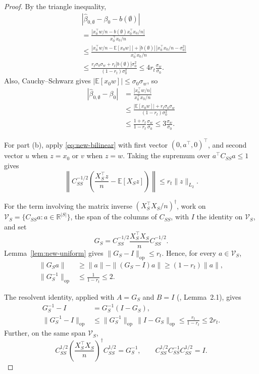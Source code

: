 \documentclass[a4paper,10pt,english]{article}
\theoremstyle{definition}
\begin{document}
\begin{review}
\begin{proof}
By the triangle inequality,
\[
 \begin{aligned}
 &|\hat\beta_{0,\emptyset}-\beta_0-b(\emptyset)|\\
 &=
 \frac{
 |x_0^\top w/n-b(\emptyset)x_0^\top x_0/n|
 }{x_0^\top x_0/n}\\
 &\le
 \frac{
 |x_0^\top w/n-\mathbb E[x_0w]|
 +|b(\emptyset)|\,|x_0^\top x_0/n-\sigma_0^2|
 }{x_0^\top x_0/n}\\
 &\le
 \frac{
 r_t\sigma_0\sigma_w+r_t|b(\emptyset)|\sigma_0^2
 }{(1-r_t)\sigma_0^2}
 \le4r_t\frac{\sigma_w}{\sigma_0}.
 \end{aligned}
\]
\rbreak
Also, Cauchy--Schwarz gives
\(|\mathbb E[x_0w]|\le\sigma_0\sigma_w\), so
\[
 \begin{aligned}
 |\hat\beta_{0,\emptyset}-\beta_0|
 &=
 \frac{|x_0^\top w/n|}{x_0^\top x_0/n}\\
 &\le
 \frac{|\mathbb E[x_0w]|+r_t\sigma_0\sigma_w}
 {(1-r_t)\sigma_0^2}\\
 &\le
 \frac{1+r_t}{1-r_t}\frac{\sigma_w}{\sigma_0}
 \le3\frac{\sigma_w}{\sigma_0}.
 \end{aligned}
\]

For part (b), apply \eqref{eq:new-bilinear} with first vector
\((0,a^\top,0)^\top\), and second vector \(u\) when \(z=x_0\) or \(v\)
when \(z=w\).
\rbreak
Taking the supremum over \(a^\top C_{SS}a\le1\) gives
\begin{equation}\label{eq:new-vector-moments}
 \left\|
 C_{SS}^{-1/2}
 \left(\frac{X_S^\top z}{n}-\mathbb E[X_Sz]\right)
 \right\|
 \le r_t\|z\|_{L_2}.
\end{equation}

For the term involving the matrix inverse
\((X_S^\top X_S/n)^\dagger\), work on
\(\mathcal V_S=\{C_{SS}a:a\in\mathbb R^{|S|}\}\),
the span of the columns of \(C_{SS}\), with \(I\) the identity on
\(\mathcal V_S\), and set
\[
 G_S=C_{SS}^{-1/2}\frac{X_S^\top X_S}{n}C_{SS}^{-1/2}.
\]
\rbreak
Lemma~\ref{lem:new-uniform} gives
\(\|G_S-I\|_{\mathrm{op}}\le r_t\).
\rbreak
Hence, for every \(a\in\mathcal V_S\),
\begin{equation}\label{eq:new-inverse-norm}
 \begin{aligned}
 \|G_Sa\|
 &\ge\|a\|-\|(G_S-I)a\|
 \ge(1-r_t)\|a\|,\\
 \|G_S^{-1}\|_{\mathrm{op}}
 &\le\frac1{1-r_t}\le2.
 \end{aligned}
\end{equation}

The resolvent identity, applied with \(A=G_S\) and \(B=I\)
(\citeauthor{couilletLiao2022rmt}, Lemma~2.1), gives
\begin{equation}\label{eq:new-inverse-difference}
 \begin{aligned}
 G_S^{-1}-I&=G_S^{-1}(I-G_S),\\
 \|G_S^{-1}-I\|_{\mathrm{op}}
 &\le
 \|G_S^{-1}\|_{\mathrm{op}}\,
 \|I-G_S\|_{\mathrm{op}}
 \le\frac{r_t}{1-r_t}\le2r_t.
 \end{aligned}
\end{equation}
\rbreak
Further, on the same span \(\mathcal V_S\),
\[
 C_{SS}^{1/2}
 \left(\frac{X_S^\top X_S}{n}\right)^\dagger
 C_{SS}^{1/2}=G_S^{-1},\qquad
 C_{SS}^{1/2}C_{SS}^{-1}C_{SS}^{1/2}=I.
\]


\end{proof}
\end{review}
\end{document}
